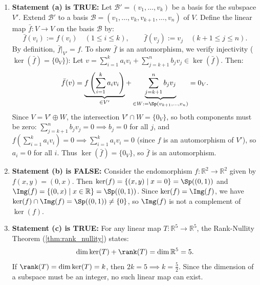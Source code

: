 \begin{exercisesolution}
\label{sol:endomorphism_properties_true_false}
\begin{enumerate}[label=\textbf{(\alph*)}]
    \item \textbf{Statement (a) is TRUE:}
    Let $\mathcal{B}' = (v_1, \dots, v_k)$ be a basis for the subspace $V'$. Extend $\mathcal{B}'$ to a basis $\mathcal{B} = (v_1, \dots, v_k, v_{k+1}, \dots, v_n)$ of $V$.
    Define the linear map $\bar{f} \colon V \to V$ on the basis $\mathcal{B}$ by:
    \[
    \bar{f}(v_i) := f(v_i) \quad (1 \le i \le k), \qquad \bar{f}(v_j) := v_j \quad (k+1 \le j \le n).
    \]
    By definition, $\bar{f}|_{V'} = f$. To show $\bar{f}$ is an automorphism, we verify injectivity ($\ker(\bar{f}) = \{0_V\}$):
    Let $v = \sum_{i=1}^k a_i v_i + \sum_{j=k+1}^n b_j v_j \in \ker(\bar{f})$. Then:
    \[
    \bar{f}(v) = \underbrace{f\left(\sum_{i=1}^k a_i v_i\right)}_{\in V'} + \underbrace{\sum_{j=k+1}^n b_j v_j}_{\in W := \Sp(v_{k+1}, \dots, v_n)} = 0_V.
    \]
    Since $V = V' \oplus W$, the intersection $V' \cap W = \{0_V\}$, so both components must be zero:
    $\sum_{j=k+1}^n b_j v_j = 0 \implies b_j = 0$ for all $j$, and $f(\sum_{i=1}^k a_i v_i) = 0 \implies \sum_{i=1}^k a_i v_i = 0$ (since $f$ is an automorphism of $V'$), so $a_i = 0$ for all $i$.
    Thus $\ker(\bar{f}) = \{0_V\}$, so $\bar{f}$ is an automorphism.

    \item \textbf{Statement (b) is FALSE:}
    Consider the endomorphism $f \colon \mathbb{R}^2 \to \mathbb{R}^2$ given by $f(x, y) = (0, x)$.
    Then $\ker(f) = \{(x, y) \mid x = 0\} = \Sp((0, 1))$ and $\Img(f) = \{(0, x) \mid x \in \mathbb{R}\} = \Sp((0, 1))$.
    Since $\ker(f) = \Img(f)$, we have $\ker(f) \cap \Img(f) = \Sp((0, 1)) \ne \{0\}$, so $\Img(f)$ is not a complement of $\ker(f)$.

    \item \textbf{Statement (c) is TRUE:}
    For any linear map $T \colon \mathbb{R}^5 \to \mathbb{R}^5$, the Rank-Nullity Theorem (\cref{thm:rank_nullity}) states:
    \[
    \dim \ker(T) + \rank(T) = \dim \mathbb{R}^5 = 5.
    \]
    If $\rank(T) = \dim \ker(T) = k$, then $2k = 5 \implies k = \frac{5}{2}$. Since the dimension of a subspace must be an integer, no such linear map can exist.
\end{enumerate}
\end{exercisesolution}
